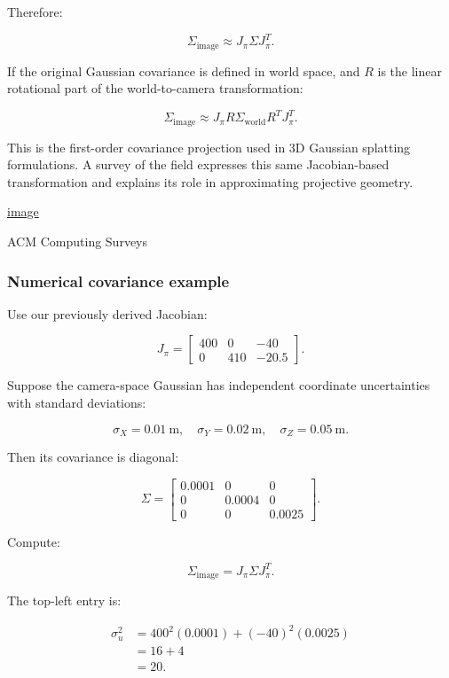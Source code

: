 Therefore:

\[
\boxed{ \Sigma_{\text{image}} \approx J_\pi\Sigma J_\pi^T }.
\]

If the original Gaussian covariance is defined in world space, and \(R\) is the linear rotational part of the world-to-camera transformation:

\[
\boxed{ \Sigma_{\text{image}} \approx J_\pi R\Sigma_{\text{world}}R^TJ_\pi^T }.
\]

This is the first-order covariance projection used in 3D Gaussian splatting formulations. A survey of the field expresses this same Jacobian-based transformation and explains its role in approximating projective geometry. 

\href{https://www.google.com/s2/favicons?domain=https://doi.org&sz=32}{image}

ACM Computing Surveys

\subsubsection{Numerical covariance example}\label{02-foundations-ii-ch021-numerical-covariance-example}

Use our previously derived Jacobian:

\[
J_\pi= \begin{bmatrix} 400&0&-40\\ 0&410&-20.5 \end{bmatrix}.
\]

Suppose the camera-space Gaussian has independent coordinate uncertainties with standard deviations:

\[
\sigma_X=0.01\ \mathrm m,\quad \sigma_Y=0.02\ \mathrm m,\quad \sigma_Z=0.05\ \mathrm m.
\]

Then its covariance is diagonal:

\[
\Sigma= \begin{bmatrix} 0.0001&0&0\\ 0&0.0004&0\\ 0&0&0.0025 \end{bmatrix}.
\]

Compute:

\[
\Sigma_{\text{image}}=J_\pi\Sigma J_\pi^T.
\]

The top-left entry is:

\[
\begin{aligned} \sigma_u^2 &=400^2(0.0001)+(-40)^2(0.0025)\\ &=16+4\\ &=\boxed{20}. \end{aligned}
\]


